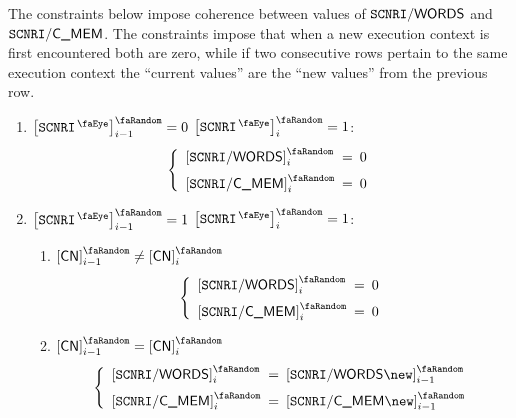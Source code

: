 The constraints below impose coherence between values of
$\texttt{SCNRI}\textsf{/}{\textsf{WORDS}}$ and
$\texttt{SCNRI}\textsf{/}{\textsf{C\_MEM}} $.
The constraints impose that when a new execution context is first encountered both are zero,
while if two consecutive rows pertain to the same execution context the ``current values'' are the ``new values'' from the previous row.
\begin{enumerate}
	\item
		\If $\order{\isMxpScenario} _{i - 1} = 0$
		\et $\order{\isMxpScenario} _{i}     = 1$:
		\Then
		\[
			\left\{ \begin{array}{lcl}
				\order{\mxpScenarioWords} _{i} & \!\!\! = \!\!\! & 0 \vspace{2mm} \\
				\order{\mxpScenarioCmem }  _{i} & \!\!\! = \!\!\! & 0 \\
			\end{array} \right.
		\]
	\item
		\If $\order{\isMxpScenario} _{i - 1} = 1$
		\et $\order{\isMxpScenario} _{i}     = 1$:
		\Then
		\begin{enumerate}
			\item \If $\order{\cn}_{i - 1} \neq \order{\cn}_{i}$ \Then
				\[
					\left\{ \begin{array}{lcl}
						\order{\mxpScenarioWords} _{i} & \!\!\! = \!\!\! & 0 \vspace{2mm} \\
						\order{\mxpScenarioCmem}  _{i} & \!\!\! = \!\!\! & 0 \\
					\end{array} \right.
				\]
			\item \If $\order{\cn}_{i - 1} = \order{\cn}_{i}$ \Then
				\[
					\left\{ \begin{array}{lcl}
						\order{\mxpScenarioWords} _{i} & \!\!\! = \!\!\! & \order{\mxpScenarioWords\new} _{i - 1} \vspace{2mm} \\
						\order{\mxpScenarioCmem}  _{i} & \!\!\! = \!\!\! & \order{\mxpScenarioCmem\new } _{i - 1} \\
					\end{array} \right.
				\]
		\end{enumerate}
\end{enumerate}
